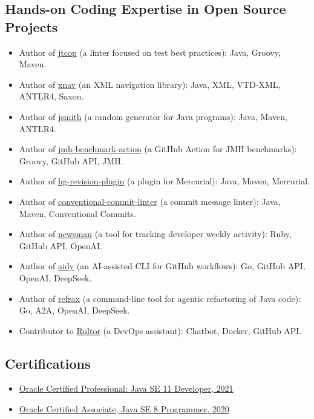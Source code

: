 \documentclass{vl}
\begin{document}
    \subsection*{Hands-on Coding Expertise in Open Source Projects}
    \begin{itemize}
        \itemsep0em
        \item Author of \href{https://github.com/volodya-lombrozo/jtcop}{jtcop} (a linter focused on test best practices): Java, Groovy, Maven.
        \item Author of \href{https://github.com/volodya-lombrozo/xnav}{xnav} (an XML navigation library): Java, XML, VTD-XML, ANTLR4, Saxon.
        \item Author of \href{https://github.com/volodya-lombrozo/jsmith}{jsmith} (a random generator for Java programs): Java, Maven, ANTLR4.
        \item Author of \href{https://github.com/volodya-lombrozo/jmh-benchmark-action}{jmh-benchmark-action} (a GitHub Action for JMH benchmarks): Groovy, GitHub API, JMH.
        \item Author of \href{https://github.com/volodya-lombrozo/hg-revision-plugin}{hg-revision-plugin} (a plugin for Mercurial): Java, Maven, Mercurial.
        \item Author of \href{https://github.com/volodya-lombrozo/conventional-commit-linter}{conventional-commit-linter} (a commit message linter): Java, Maven, Conventional Commits.
        \item Author of \href{https://github.com/volodya-lombrozo/newsman}{newsman} (a tool for tracking developer weekly activity): Ruby, GitHub API, OpenAI.
        \item Author of \href{https://github.com/volodya-lombrozo/aidy}{aidy} (an AI-assisted CLI for GitHub workflows): Go, GitHub API, OpenAI, DeepSeek.
        \item Author of \href{https://github.com/cqfn/refrax}{refrax} (a command-line tool for agentic refactoring of Java code): Go, A2A, OpenAI, DeepSeek.
        \item Contributor to \href{https://www.rultor.com}{Rultor} (a DevOps assistant): Chatbot, Docker, GitHub API.
    \end{itemize}

    \subsection*{Certifications}

    \begin{itemize}
        \itemsep0em
        \item \href{https://catalog-education.oracle.com/pls/certview/sharebadge?id=87F6A2FE819A5A5AF4120A05900AB28A461EE9A3EE9FBFA02721FADAEB3BCE19}{Oracle Certified Professional: Java SE 11 Developer, 2021}
        \item \href{https://www.credly.com/badges/e2d9ddda-20dc-433d-8ab7-18548fd0fd8f/public_url}{Oracle Certified Associate, Java SE 8 Programmer, 2020}
    \end{itemize}
\end{document}

